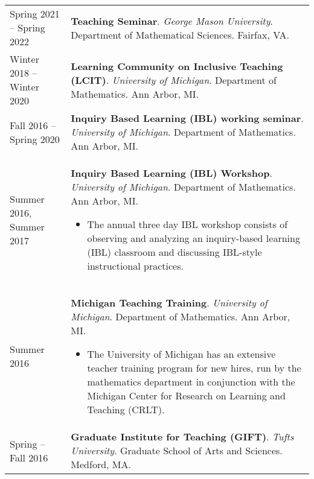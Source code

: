 
    \medskip


    \medskip
    
    \begin{center}
    {
    \renewcommand{\arraystretch}{1.2}
    \begin{longtable}{p{}  p{}}
      Spring 2021 --   Spring 2022 & \textbf{Teaching Seminar}. \textit{George Mason University}.  Department of Mathematical Sciences. Fairfax, VA.  \\ 
  Winter 2018 --   Winter 2020 & \textbf{Learning Community on Inclusive Teaching (LCIT)}. \textit{University of Michigan}.  Department of Mathematics. Ann Arbor, MI.  \\ 
  Fall 2016 --   Spring 2020 & \textbf{Inquiry Based Learning (IBL) working seminar}. \textit{University of Michigan}.  Department of Mathematics. Ann Arbor, MI.  \\ 
  Summer 2016,   Summer 2017 & \textbf{Inquiry Based Learning (IBL) Workshop}. \textit{University of Michigan}.  Department of Mathematics. Ann Arbor, MI. 
        \hspace{-1em}

        {\small
        \begin{itemize}
        \setlength{\parindent}{0em}
        \item[] The annual three day IBL workshop consists of observing and analyzing an inquiry-based learning (IBL) classroom and discussing IBL-style instructional practices.
        \end{itemize}
        }
        \vspace{-1em}
         \\ 
  Summer 2016 & \textbf{Michigan Teaching Training}. \textit{University of Michigan}.  Department of Mathematics. Ann Arbor, MI. 
        \hspace{-1em}

        {\small
        \begin{itemize}
        \setlength{\parindent}{0em}
        \item[] The University of Michigan has an extensive teacher training program for new hires, run by the mathematics department in conjunction with the Michigan Center for Research on Learning and Teaching (CRLT).
        \end{itemize}
        }
        \vspace{-1em}
         \\ 
 Spring --   Fall 2016 & \textbf{Graduate Institute for Teaching (GIFT)}. \textit{Tufts University}.  Graduate School of Arts and Sciences. Medford, MA. 
        \hspace{-1em}


\end{longtable}}
\end{center}
